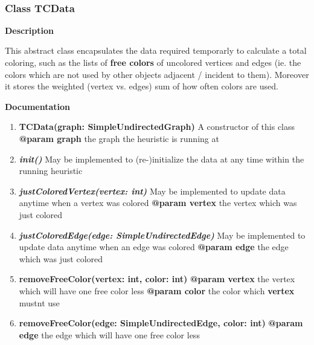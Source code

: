 \documentclass{article}
\newcommand{\myclass}[1]{\subsubsection*{Class #1} \label{#1} \addcontentsline{toc}{subsubsection}{\nameref{#1}}}
\begin{document}
	~\newline
	~\newline
	~\newline
	
	\myclass{TCData}
	
	\textbf{Description}
	
	This abstract class encapsulates the data required temporarly to calculate a total coloring, such as the lists of \textbf{free colors} of uncolored vertices and edges (ie. the colors which are not used by other objects adjacent / incident to them). Moreover it stores the weighted (vertex vs. edges) sum of how often colors are used.
	
	\textbf{Documentation}
	
	\begin{enumerate}[\#]
		\item{
			\textbf{TCData(graph: SimpleUndirectedGraph)} \newline
			A constructor of this class \newline
			\textbf{@param graph} the graph the heuristic is running at
		}
		\item{
			\textbf{\textit{init()}} \newline
			May be implemented to (re-)initialize the data at any time within the running heuristic
		}
		\item{
			\textbf{\textit{justColoredVertex(vertex: int)}} \newline
			May be implemented to update data anytime when a vertex was colored \newline
			\textbf{@param vertex} the vertex which was just colored
		}
		\item{
			\textbf{\textit{justColoredEdge(edge: SimpleUndirectedEdge)}} \newline
			May be implemented to update data anytime when an edge was colored \newline
			\textbf{@param edge} the edge which was just colored
		}
		\item{
			\textbf{removeFreeColor(vertex: int, color: int)} \newline
			\textbf{@param vertex} the vertex which will have one free color less \newline
			\textbf{@param color} the color which \textbf{vertex} mustnt use
		}
		\item{
			\textbf{removeFreeColor(edge: SimpleUndirectedEdge, color: int)} \newline
			\textbf{@param edge} the edge which will have one free color less \newline
}
\end{enumerate}
\end{document}
